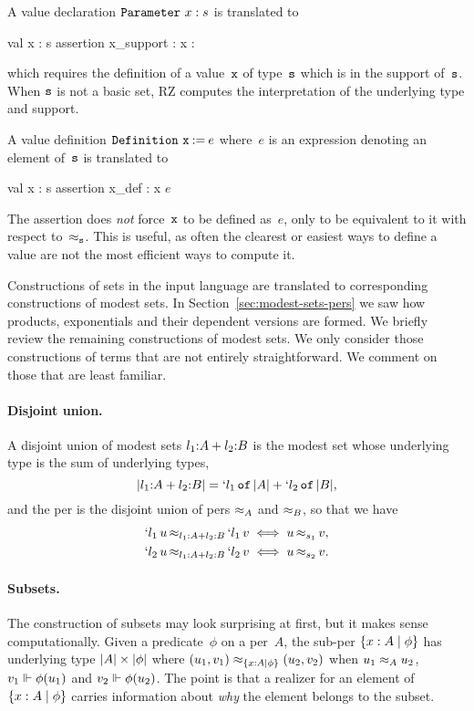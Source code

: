 A value declaration $\iParameter{x}{s}$ is translated to
%
\begin{source}
val x : s
assertion x_support : x : 
\end{source}
%
which requires the definition of a value~$\f{x}$ of type~$\f{s}$ which is in
the support of~$\f{s}$.
\iflong
When $\f{s}$ is not a basic set, RZ computes the
interpretation of the underlying type and support.
\fi

A value definition $\iDefinition{\f{x}}{e}$ where~$e$ is an expression
denoting an element of~$\f{s}$ is translated to
%
\newcommand{\iE}{$e$}
\begin{source}
val x : s
assertion x_def : x  \iE
\end{source}
%
The assertion does \emph{not} force~$\f{x}$ to be defined as~$e$, only
to be equivalent to it with respect to~$\per_{\f{s}}$. This is
useful, as often the clearest or easiest ways to define a value are not the most
efficient ways to compute it.

Constructions of sets in the input language are translated to
corresponding constructions of modest sets.
%
\iflong
In Section~\ref{sec:modest-sets-pers} we saw how products,
exponentials and their dependent versions are formed. We briefly
review the remaining constructions of modest sets. We only consider
those constructions of terms that are not entirely straightforward.
%
\else
%
We comment on those that are least familiar.
%
\fi

\iflong
\paragraph{Disjoint union.}
%
A disjoint union of modest sets $\isum{\il_1}{A}{\il_2}{B}$ is the
modest set whose underlying type is the sum of underlying types,
%
\begin{equation*}
  \typeOf{\isum{\il_1}{A}{\il_2}{B}} =
  \osumtyx{\il_1}{\typeOf{A}}{\il_2}{\typeOf{B}},
\end{equation*}
%
and the per is the disjoint union of pers $\per_{A}$ and $\per_{B}$, so
that we have
%
\begin{align*}
  \oper{\isum{\il_1}{A}{\il_2}{B}}{\oinj{\il_1}{u}}{\oinj{\il_1}{v}}
  &\iff \oper{s_1}{u}{v},
  \\
  \oper{\isum{\il_1}{A}{\il_2}{B}}{\oinj{\il_2}{u}}{\oinj{\il_2}{v}}
  &\iff \oper{s_2}{u}{v}.
\end{align*}
\fi %

\paragraph{Subsets.}
%
\iflong
%
The construction of subsets may look surprising at first, but
it makes sense computationally.
\fi
Given a predicate~$\phi$ on a per~$A$, the sub-per $\set{x : A
  \such \phi}$ has underlying type $\typeOf{A} \times \typeOf{\phi}$
where $(u_1,v_1) \per_{\set{x : A \such \phi}} (u_2,v_2)$ when $u_1
\per_A u_2$, $v_1 \rz \phi(u_1)$ and $v_2 \rz \phi(u_2)$. The point is
that a realizer for an element of $\set{x : A
  \such \phi}$ carries information about \emph{why} the element
belongs to the subset.

